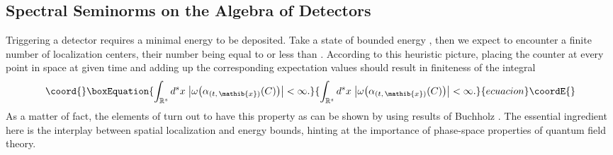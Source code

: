 \documentclass[a4paper,a4paper]{article}
\numberwithin{equation}{section}
\providecommand{\Cfrak}{\mathfrak{C}}
\providecommand{\xib}{\mathib{x}}
\providecommand{\Rs}{\mathbb{R}^s}
\theoremstyle{definition}
\theoremstyle{plain}
\theoremstyle{remark}
\providecommand{\babs}[1]{\bigl\lvert #1 \bigr\rvert}
\begin{document}
\subsection{Spectral Seminorms on the Algebra of Detectors}
  
  Triggering a detector \myHighlight{$C \in \Cfrak$}\coordHE{} requires a minimal energy
  \myHighlight{$\epsilon$}\coordHE{} to be deposited. Take a state \myHighlight{$\omega$}\coordHE{} of bounded energy
  \coordHE{}, then we expect to encounter a finite number of localization
  centers, their number being equal to or less than
  \coordHE{}. According to this heuristic picture, placing the
  counter \coordHE{} at every point \myHighlight{$\xib$}\coordHE{} in space \myHighlight{$\Rs$}\coordHE{} at given time \coordHE{}
  and adding up the corresponding expectation values \myHighlight{$\omega \bigl(
  \alpha_{( t , \, \xib )} ( C ) \bigr)$}\coordHE{} should result in finiteness
  of the integral 
  \begin{equation}\coord{}\boxEquation{
    \label{eq:heuristic-integral}
    \int_{\Rs} d^s x \; \babs{\omega \bigl( \alpha_{( t , \, \xib )} (
    C ) \bigr)} < \infty \text{.} 
  }{
    \int_{\Rs} d^s x \; \babs{\omega \bigl( \alpha_{( t , \, \xib )} (
    C ) \bigr)} < \infty \text{.} 
  }{ecuacion}\coordE{}\end{equation}
  As a matter of fact, the elements of \myHighlight{$\Cfrak$}\coordHE{} turn out to have this
  property as can be shown by using results of Buchholz
  \cite{buchholz:1990}. The essential ingredient here is the interplay
  between spatial localization and energy bounds, hinting at the
  importance of phase-space properties of quantum field theory.
\end{document}
